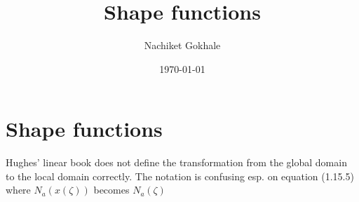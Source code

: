 \documentclass{article}
\begin{document}
\title{Shape functions}
\author{Nachiket Gokhale}
\date{\today}
\maketitle
\section{Shape functions}
Hughes' linear book does not define the transformation from the global domain to the local domain correctly. The notation is confusing esp. on equation (1.15.5) where $N_a(x(\zeta))$ becomes $N_a(\zeta)$
\end{document}
